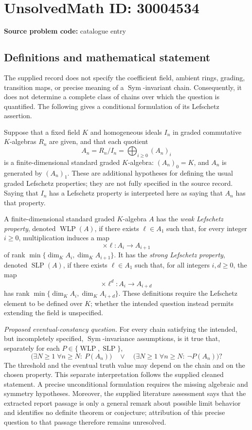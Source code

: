 \documentclass[11pt]{article}
\begin{document}
\section*{UnsolvedMath ID: 30004534}
\textbf{Source problem code:} catalogue entry
\subsection{Definitions and mathematical statement}
The supplied record does not specify the coefficient field, ambient rings, grading, transition maps, or precise meaning of a \(\operatorname{Sym}\)-invariant chain. Consequently, it does not determine a complete class of chains over which the question is quantified. The following gives a conditional formulation of its Lefschetz assertion.

Suppose that a fixed field \(K\) and homogeneous ideals \(I_n\) in graded commutative \(K\)-algebras \(R_n\) are given, and that each quotient
\[
A_n=R_n/I_n=\bigoplus_{i\geq 0}(A_n)_i
\]
is a finite-dimensional standard graded \(K\)-algebra: \((A_n)_0=K\), and \(A_n\) is generated by \((A_n)_1\). These are additional hypotheses for defining the usual graded Lefschetz properties; they are not fully specified in the source record. Saying that \(I_n\) has a Lefschetz property is interpreted here as saying that \(A_n\) has that property.

A finite-dimensional standard graded \(K\)-algebra \(A\) has the \emph{weak Lefschetz property}, denoted \(\operatorname{WLP}(A)\), if there exists \(\ell\in A_1\) such that, for every integer \(i\geq0\), multiplication induces a map
\[
\times\ell:A_i\longrightarrow A_{i+1}
\]
of rank \(\min\{\dim_K A_i,\dim_K A_{i+1}\}\). It has the \emph{strong Lefschetz property}, denoted \(\operatorname{SLP}(A)\), if there exists \(\ell\in A_1\) such that, for all integers \(i,d\geq0\), the map
\[
\times\ell^d:A_i\longrightarrow A_{i+d}
\]
has rank \(\min\{\dim_K A_i,\dim_K A_{i+d}\}\). These definitions require the Lefschetz element to be defined over \(K\); whether the intended question instead permits extending the field is unspecified.

\emph{Proposed eventual-constancy question.} For every chain satisfying the intended, but incompletely specified, \(\operatorname{Sym}\)-invariance assumptions, is it true that, separately for each \(P\in\{\operatorname{WLP},\operatorname{SLP}\}\),
\[
\bigl(\exists N\geq1\;\forall n\geq N:\ P(A_n)\bigr)
\quad\lor\quad
\bigl(\exists N\geq1\;\forall n\geq N:\ \neg P(A_n)\bigr)?
\]
The threshold and the eventual truth value may depend on the chain and on the chosen property. This separate interpretation follows the supplied cleaned statement. A precise unconditional formulation requires the missing algebraic and symmetry hypotheses. Moreover, the supplied literature assessment says that the extracted report passage is only a general remark about possible limit behavior and identifies no definite theorem or conjecture; attribution of this precise question to that passage therefore remains unresolved.
\end{document}
